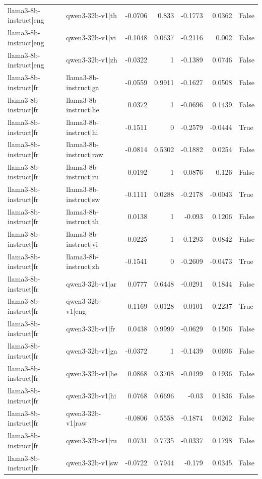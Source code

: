 \begin{table}
\begin{tabular}{l l r r r r l}
llama3-8b-instruct|eng & qwen3-32b-v1|th & -0.0706 & 0.833 & -0.1773 & 0.0362 & False \\
llama3-8b-instruct|eng & qwen3-32b-v1|vi & -0.1048 & 0.0637 & -0.2116 & 0.002 & False \\
llama3-8b-instruct|eng & qwen3-32b-v1|zh & -0.0322 & 1 & -0.1389 & 0.0746 & False \\
llama3-8b-instruct|fr & llama3-8b-instruct|ga & -0.0559 & 0.9911 & -0.1627 & 0.0508 & False \\
llama3-8b-instruct|fr & llama3-8b-instruct|he & 0.0372 & 1 & -0.0696 & 0.1439 & False \\
llama3-8b-instruct|fr & llama3-8b-instruct|hi & -0.1511 & 0 & -0.2579 & -0.0444 & True \\
llama3-8b-instruct|fr & llama3-8b-instruct|raw & -0.0814 & 0.5302 & -0.1882 & 0.0254 & False \\
llama3-8b-instruct|fr & llama3-8b-instruct|ru & 0.0192 & 1 & -0.0876 & 0.126 & False \\
llama3-8b-instruct|fr & llama3-8b-instruct|sw & -0.1111 & 0.0288 & -0.2178 & -0.0043 & True \\
llama3-8b-instruct|fr & llama3-8b-instruct|th & 0.0138 & 1 & -0.093 & 0.1206 & False \\
llama3-8b-instruct|fr & llama3-8b-instruct|vi & -0.0225 & 1 & -0.1293 & 0.0842 & False \\
llama3-8b-instruct|fr & llama3-8b-instruct|zh & -0.1541 & 0 & -0.2609 & -0.0473 & True \\
llama3-8b-instruct|fr & qwen3-32b-v1|ar & 0.0777 & 0.6448 & -0.0291 & 0.1844 & False \\
llama3-8b-instruct|fr & qwen3-32b-v1|eng & 0.1169 & 0.0128 & 0.0101 & 0.2237 & True \\
llama3-8b-instruct|fr & qwen3-32b-v1|fr & 0.0438 & 0.9999 & -0.0629 & 0.1506 & False \\
llama3-8b-instruct|fr & qwen3-32b-v1|ga & -0.0372 & 1 & -0.1439 & 0.0696 & False \\
llama3-8b-instruct|fr & qwen3-32b-v1|he & 0.0868 & 0.3708 & -0.0199 & 0.1936 & False \\
llama3-8b-instruct|fr & qwen3-32b-v1|hi & 0.0768 & 0.6696 & -0.03 & 0.1836 & False \\
llama3-8b-instruct|fr & qwen3-32b-v1|raw & -0.0806 & 0.5558 & -0.1874 & 0.0262 & False \\
llama3-8b-instruct|fr & qwen3-32b-v1|ru & 0.0731 & 0.7735 & -0.0337 & 0.1798 & False \\
llama3-8b-instruct|fr & qwen3-32b-v1|sw & -0.0722 & 0.7944 & -0.179 & 0.0345 & False \\

\end{tabular}
\end{table}
